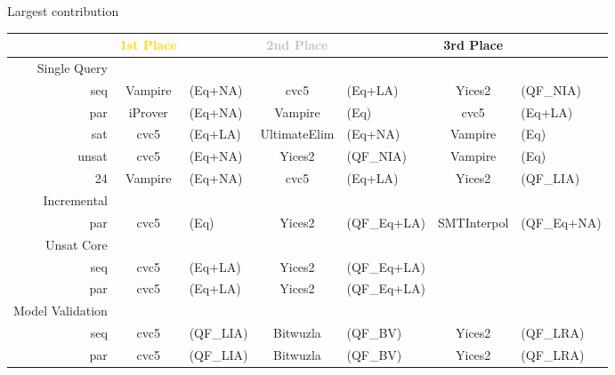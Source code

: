 \documentclass[table]{beamer}
\def\emph#1{\textcolor{MYblue}{#1}}
\begin{document}
\begin{frame}{Largest contribution}
  \begin{tabular}{r|c@{}lc@{}lc@{}l}
    &\textcolor{gold}{\textbf{1st Place}} &&
    \textcolor{silver}{\textbf{2nd Place}} &&
    \textcolor{bronze}{\textbf{3rd Place}}\\
    \hline
    \emph{Single Query}\\
    seq & Vampire&{\tiny(Eq+NA)} & cvc5&{\tiny(Eq+LA)} & Yices2&{\tiny(QF\_NIA)} \\
    par & iProver&{\tiny(Eq+NA)} & Vampire&{\tiny(Eq)} & cvc5&{\tiny(Eq+LA)} \\
    sat & cvc5&{\tiny(Eq+LA)} & UltimateElim&{\tiny(Eq+NA)} & Vampire&{\tiny(Eq)}\\
    unsat & cvc5&{\tiny(Eq+NA)} & Yices2&{\tiny(QF\_NIA)} & Vampire&{\tiny(Eq)}\\
    24 &  Vampire&{\tiny(Eq+NA)} & cvc5&{\tiny(Eq+LA)} & Yices2&{\tiny(QF\_LIA)}\\[3pt]
    \pause
    \emph{Incremental}\\
    par & cvc5&{\tiny(Eq)} &Yices2&{\tiny(QF\_Eq+LA)}
    &SMTInterpol&{\tiny(QF\_Eq+NA)}\\[3pt]
    \pause
    \emph{Unsat Core}\\
    seq & cvc5&{\tiny(Eq+LA)} &
    Yices2&{\tiny(QF\_Eq+LA)}\\
    par &  cvc5&{\tiny(Eq+LA)}&
    Yices2&{\tiny(QF\_Eq+LA)}\\[3pt]
    \pause
    \emph{Model Validation}\\
    seq &  cvc5&{\tiny(QF\_LIA)} & Bitwuzla&{\tiny(QF\_BV)}
        & Yices2&{\tiny(QF\_LRA)}\\
    par &  cvc5&{\tiny(QF\_LIA)} & Bitwuzla&{\tiny(QF\_BV)}
        & Yices2&{\tiny(QF\_LRA)}\\
  \end{tabular}
\end{frame}
\end{document}
